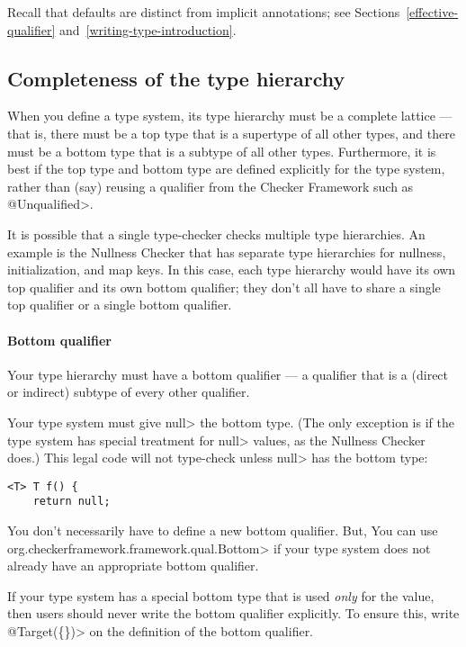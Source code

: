 Recall that defaults are distinct
from implicit annotations; see Sections~\ref{effective-qualifier}
and~\ref{writing-type-introduction}.


\subsection{Completeness of the type hierarchy\label{bottom-and-top-qualifier}}

When you define a type system, its type hierarchy must be a
complete lattice --- that is, there must be a top type that is a
supertype of all other types, and there must be a bottom type that is a
subtype of all other types.
Furthermore, it is best if the top type and bottom type are defined
explicitly for the type system, rather than (say) reusing a qualifier from the
Checker Framework such as \<@Unqualified>.

It is possible that a single type-checker checks multiple type hierarchies.
An example is the Nullness Checker that has separate type hierarchies for
nullness, initialization, and map keys.  In this case, each type hierarchy
would have its own top qualifier and its own bottom qualifier; they don't
all have to share a single top qualifier or a single bottom qualifier.


\paragraph{Bottom qualifier\label{bottom-qualifier}}
Your type hierarchy must have a bottom qualifier
--- a qualifier that is a (direct or indirect) subtype of every other
qualifier.

Your type system must give \<null> the bottom type.  (The only exception
is if the type system has special treatment for \<null> values, as the
Nullness Checker does.)  This legal code
will not type-check unless \<null> has the bottom type:
\begin{Verbatim}
<T> T f() {
    return null;
\end{Verbatim}

You don't necessarily have to define a new bottom qualifier.  But, You can
use \<org.checkerframework.framework.qual.Bottom> if your type system does not already have an
appropriate bottom qualifier.

If your type system has a special bottom type that is used \emph{only} for
the  value, then users should never write the bottom qualifier
explicitly.  To ensure this, write \<@Target(\{\})> on the definition of
the bottom qualifier.


